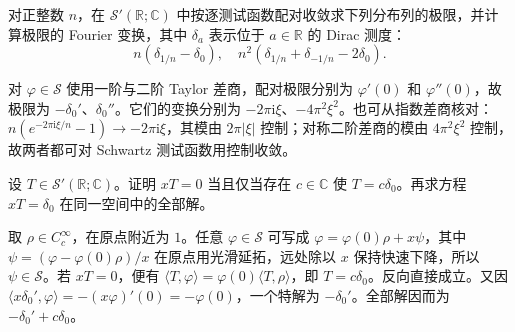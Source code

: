 \begin{exercise}\label{b2:ex:05-delta-differences}
对正整数 \(n\)，在 \(\mathcal S'(\mathbb R;\mathbb C)\) 中按逐测试函数配对收敛求下列分布列的极限，并计算极限的 Fourier 变换，其中 \(\delta_a\) 表示位于 \(a\in\mathbb R\) 的 Dirac 测度：
\[
 n(\delta_{1/n}-\delta_0),\quad
 n^2(\delta_{1/n}+\delta_{-1/n}-2\delta_0).
\]
\end{exercise}
\begin{solution}
对 \(\varphi\in\mathcal S\) 使用一阶与二阶 Taylor 差商，配对极限分别为 \(\varphi'(0)\) 和 \(\varphi''(0)\)，故极限为 \(-\delta_0'\)、\(\delta_0''\)。它们的变换分别为 \(-2\pi\mathrm{i}\xi\)、\(-4\pi^2\xi^2\)。也可从指数差商核对：\(n(e^{-2\pi\mathrm{i}\xi/n}-1)\to-2\pi\mathrm{i}\xi\)，其模由 \(2\pi|\xi|\) 控制；对称二阶差商的模由 \(4\pi^2\xi^2\) 控制，故两者都可对 Schwartz 测试函数用控制收敛。
\end{solution}

\begin{exercise}\label{b2:ex:05-x-times-distribution}
设 \(T\in\mathcal S'(\mathbb R;\mathbb C)\)。证明 \(xT=0\) 当且仅当存在 \(c\in\mathbb C\) 使 \(T=c\delta_0\)。再求方程 \(xT=\delta_0\) 在同一空间中的全部解。
\end{exercise}
\begin{solution}
取 \(\rho\in C_c^\infty\)，在原点附近为 \(1\)。任意 \(\varphi\in\mathcal S\) 可写成 \(\varphi=\varphi(0)\rho+x\psi\)，其中 \(\psi=(\varphi-\varphi(0)\rho)/x\) 在原点用光滑延拓，远处除以 \(x\) 保持快速下降，所以 \(\psi\in\mathcal S\)。若 \(xT=0\)，便有 \(\langle T,\varphi\rangle=\varphi(0)\langle T,\rho\rangle\)，即 \(T=c\delta_0\)。反向直接成立。又因 \(\langle x\delta_0',\varphi\rangle=-(x\varphi)'(0)=-\varphi(0)\)，一个特解为 \(-\delta_0'\)。全部解因而为 \(-\delta_0'+c\delta_0\)。
\end{solution}

